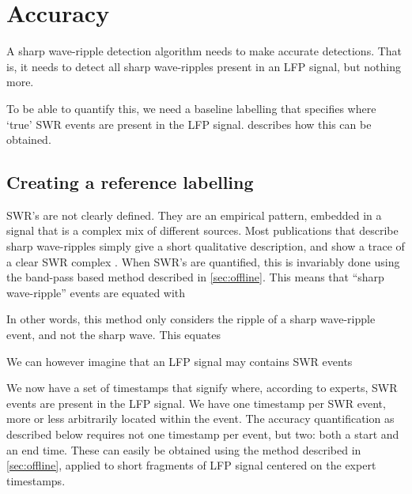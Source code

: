 
\section{Accuracy}


A sharp wave-ripple detection algorithm needs to make accurate detections. That is, it needs to detect all sharp wave-ripples present in an LFP signal, but nothing more.

To be able to quantify this, we need a baseline labelling that specifies where `true' SWR events are present in the LFP signal.  describes how this can be obtained.





\subsection{Creating a reference labelling}
\label{sec:reference_labelling}

SWR's are not clearly defined. They are an empirical pattern, embedded in a signal that is a complex mix of different sources. Most publications that describe sharp wave-ripples simply give a short qualitative description, and show a trace of a clear SWR complex \cite{Buzsaki2015}. When SWR's are quantified, this is invariably done using the band-pass based method described in \cref{sec:offline}. This means that ``sharp wave-ripple'' events are equated with 

In other words, this method only considers the ripple of a sharp wave-ripple event, and not the sharp wave. This equates 

We can however imagine that an LFP signal may contains SWR events 




We now have a set of timestamps that signify where, according to experts,  SWR events are present in the LFP signal. We have one timestamp per SWR event, more or less arbitrarily located within the event. The accuracy quantification as described below requires not one timestamp per event, but two: both a start and an end time. These can easily be obtained using the method described in \cref{sec:offline}, applied to short fragments of LFP signal centered on the expert timestamps.

